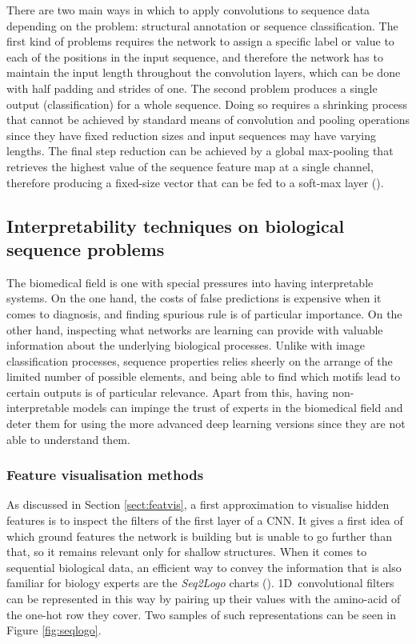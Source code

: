 There are two main ways in which to apply convolutions to sequence data depending on the problem: structural annotation or sequence classification. The first kind of problems requires the network to assign a specific label or value to each of the positions in the input sequence, and therefore the network has to maintain the input length throughout the convolution layers, which can be done with half padding and strides of one. The second problem produces a single output (classification) for a whole sequence. Doing so requires a shrinking process that cannot be achieved by standard means of convolution and pooling operations since they have fixed reduction sizes and input sequences may have varying lengths. The final step reduction can be achieved by a global max-pooling that retrieves the highest value of the sequence feature map at a single channel, therefore producing a fixed-size vector that can be fed to a soft-max layer (\cite{Jurtz2017}).


\subsection{Interpretability techniques on biological sequence problems}
The biomedical field is one with special pressures into having interpretable systems. On the one hand, the costs of false predictions is expensive when it comes to diagnosis, and finding spurious rule is of particular importance. On the other hand, inspecting what networks are learning can provide with valuable information about the underlying biological processes. Unlike with image classification processes, sequence properties relies sheerly on the arrange of the limited number of possible elements, and being able to find which motifs lead to certain outputs is of particular relevance. Apart from this, having non-interpretable models can impinge the trust of experts in the biomedical field and deter them for using the more advanced deep learning versions since they are not able to understand them.

\subsubsection*{Feature visualisation methods}
As discussed in Section \ref{sect:featvis}, a first approximation to visualise hidden features is to inspect the filters of the first layer of a CNN. It gives a first idea of which ground features the network is building but is unable to go further than that, so it remains relevant only for shallow structures. When it comes to sequential biological data, an efficient way to convey the information that is also familiar for biology experts are the \textit{Seq2Logo} charts (\cite{Thomsen2012}). 1D~convolutional filters can be represented in this way by pairing up their values with the amino-acid of the one-hot row they cover. Two samples of such representations can be seen in Figure \ref{fig:seqlogo}.

